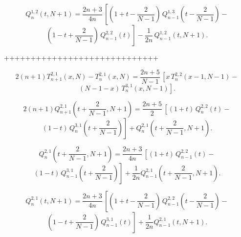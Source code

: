 \documentclass[12pt]{book}
\begin{document}
\begin{equation*}
  Q^{1,2}_{n}\left(t,N+1\right)
   =
  \frac{2n+3}{4n}\,
  \left[
    \left(1+t-\frac{2}{N-1}\right)\,Q^{1,3}_{n-1}\left(t-\frac{2}{N-1}\right)-
  \right.
\end{equation*}
\begin{equation*}
\left.
  \left(1-t+\frac{2}{N-1}\right)\,Q^{2,2}_{n-1}\left(t\right)
  \right]
  - \frac{1}{2n}\, Q^{1,2}_{n-1}\left(t,N+1\right).
\end{equation*}




+++++++++++++++++++++++++++++




\begin{equation*}
  2(n+1) T^{2,1}_{n+1}(x,N) - T^{2,1}_{n}(x,N)
  = \frac{2n+5}{N-1}\,\left[
  x\,T^{2,2}_{n}(x-1,N-1)-
  \right.
\end{equation*}
\begin{equation*}
\left.
  (N-1-x)\,T^{3,1}_{n}(x,N-1)
  \right].
\end{equation*}

\begin{equation*}
  2(n+1) Q^{2,1}_{n+1}\left(t+\frac{2}{N-1},N+1\right)
  = \frac{2n+5}{2}\,\left[
  (1+t)\,Q^{2,2}_{n}\left(t\right)-
  \right.
\end{equation*}
\begin{equation*}
\left.
  (1-t)\,Q^{3,1}_{n}\left(t+\frac{2}{N-1}\right)
  \right] + Q^{2,1}_{n}\left(t+\frac{2}{N-1},N+1\right).
\end{equation*}

\begin{equation*}
  Q^{2,1}_{n}\left(t+\frac{2}{N-1},N+1\right)
  = \frac{2n+3}{4n}\,\left[
  (1+t)\,Q^{2,2}_{n-1}\left(t\right)-
  \right.
\end{equation*}
\begin{equation*}
\left.
  (1-t)\,Q^{3,1}_{n-1}\left(t+\frac{2}{N-1}\right)
  \right] + \frac{1}{2n} Q^{2,1}_{n-1}\left(t+\frac{2}{N-1},N+1\right).
\end{equation*}

\begin{equation*}
  Q^{2,1}_{n}\left(t,N+1\right)
  = \frac{2n+3}{4n}\,\left[
  \left(1+t-\frac{2}{N-1}\right)\,Q^{2,2}_{n-1}\left(t-\frac{2}{N-1}\right)-
  \right.
\end{equation*}
\begin{equation*}
\left.
  \left(1-t+\frac{2}{N-1}\right)\,Q^{3,1}_{n-1}\left(t\right)
  \right] + \frac{1}{2n} Q^{2,1}_{n-1}\left(t,N+1\right).
\end{equation*}
\end{document}
